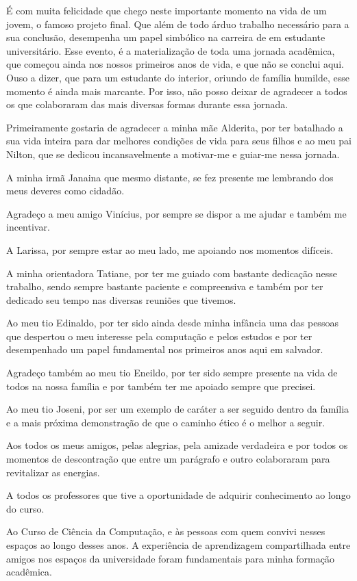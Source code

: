 É com muita felicidade que chego neste importante momento na vida de um jovem, o famoso projeto
final. Que além de todo árduo trabalho necessário para a sua conclusão, desempenha um papel
simbólico na carreira de em estudante universitário. Esse evento, é a materialização de toda uma
jornada acadêmica, que começou ainda nos nossos primeiros anos de vida, e que não se conclui aqui.
Ouso a dizer, que para um estudante do interior, oriundo de família humilde, esse momento é ainda
mais marcante. Por isso, não posso deixar
de agradecer a todos os que colaboraram das mais diversas formas durante essa jornada.

Primeiramente gostaria de agradecer a minha mãe Alderita, por ter batalhado a sua vida inteira para
dar melhores condições de vida para seus filhos e ao meu pai Nilton, que se dedicou incansavelmente a
motivar-me e guiar-me nessa jornada. 

A minha irmã Janaina que mesmo distante, se fez presente  me lembrando
dos meus deveres como cidadão.

Agradeço a meu amigo Vinícius, por sempre se dispor a me ajudar e também me incentivar. 

A Larissa, por sempre estar ao meu lado, me apoiando nos momentos difíceis. 

A minha orientadora Tatiane, por ter me guiado com bastante dedicação nesse trabalho, sendo sempre
bastante paciente e compreensiva e também por ter dedicado seu tempo nas diversas reuniões que
tivemos.

Ao meu tio Edinaldo, por ter sido ainda desde minha infância uma das pessoas que despertou o meu
interesse pela computação e pelos estudos e por ter desempenhado um papel fundamental nos primeiros
anos aqui em salvador.

Agradeço também ao meu tio Eneildo, por ter sido sempre presente na vida de todos na nossa família e
por também ter me apoiado sempre que precisei.

Ao meu tio Joseni, por ser um exemplo de caráter a ser seguido dentro da família e a mais próxima
demonstração de que o caminho ético é o melhor a seguir. 

Aos todos os meus amigos, pelas alegrias, pela amizade verdadeira e por todos os momentos de
descontração que entre um parágrafo e outro colaboraram para revitalizar as energias.

A todos os professores que tive a oportunidade de adquirir conhecimento ao longo do curso.

Ao Curso de Ciência da Computação, e às pessoas com quem convivi nesses espaços ao longo desses
anos. A experiência de aprendizagem compartilhada entre amigos nos espaços da universidade foram
fundamentais para minha formação acadêmica.
